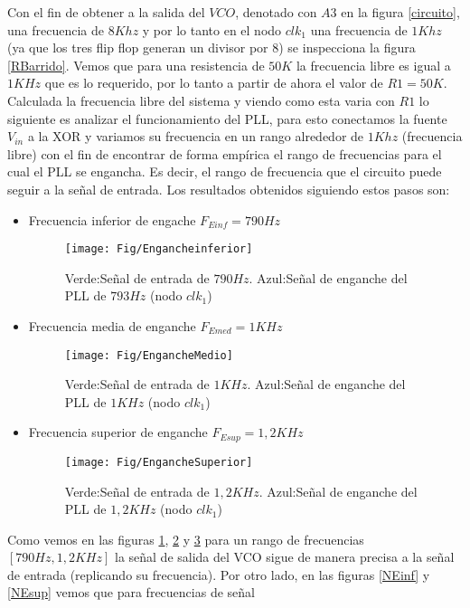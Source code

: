 \documentclass[10pt,a4paper]{IEEEtran}
\begin{document}
Con el fin de obtener a la salida del $VCO$, denotado con $A3$ en la figura \ref{circuito}, una frecuencia de $8Khz$ y por lo tanto en el nodo 
$clk_1$ una frecuencia de $1Khz$ (ya que los tres flip flop generan un divisor por 8) se inspecciona la figura \ref{RBarrido}. Vemos que para 
una resistencia de $50K$ la frecuencia libre es igual a $1KHz$ que es lo requerido, por lo tanto a partir de ahora el valor de $R1=50K$.\\
Calculada la frecuencia libre del sistema y viendo como esta varia con $R1$ lo siguiente es analizar el funcionamiento del PLL, para esto conectamos 
la fuente $V_{in}$ a la XOR y variamos su frecuencia en un rango alrededor de $1Khz$ (frecuencia libre) con el fin de encontrar de forma empírica el rango
de frecuencias para el cual el PLL se engancha. Es decir, el rango de frecuencia que el circuito puede seguir a la señal de entrada. Los resultados obtenidos siguiendo estos 
pasos son:
\begin{itemize}
    \item Frecuencia inferior de engache $F_{Einf} =790Hz$
    \begin{figure}[H]
        \centering
        \texttt{[image: Fig/Engancheinferior]}
        \caption{Verde:Señal de entrada de $790Hz$. Azul:Señal de enganche del PLL de $793Hz$ (nodo $clk_1$)}
        \label{Einf}
    \end{figure}
    \item Frecuencia media de enganche $F_{Emed}=1KHz$
    \begin{figure}[H]
        \centering
        \texttt{[image: Fig/EngancheMedio]}
        \caption{Verde:Señal de entrada de $1KHz$. Azul:Señal de enganche del PLL de $1KHz$ (nodo $clk_1$)}
        \label{Emed}
    \end{figure} 
    \item Frecuencia superior de enganche $F_{Esup}=1,2KHz$
    \begin{figure}[H]
        \centering
        \texttt{[image: Fig/EngancheSuperior]}
        \caption{Verde:Señal de entrada de $1,2KHz$. Azul:Señal de enganche del PLL de $1,2KHz$ (nodo $clk_1$)}
        \label{Esup}
    \end{figure}
\end{itemize}  
Como vemos en las figuras \ref{Einf}, \ref{Emed} y \ref{Esup} para un rango de frecuencias $[790Hz,1,2KHz]$ la señal de salida del VCO 
sigue de manera precisa a la señal de entrada (replicando su frecuencia). Por otro lado, en las figuras \ref{NEinf} y \ref{NEsup} vemos que para frecuencias de señal
\end{document}
